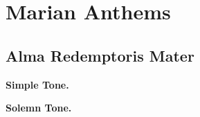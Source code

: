 \chapter{Marian Anthems}
{
\def\nogabcbreaks{T}
\newcommand{\printsimpletone}{
\vspace{-1ex plus 1ex minus 1ex}
\needspace{3\baselineskip}
\begin{center}\textbf{Simple Tone.}\end{center}
\vspace{-1ex plus 1ex minus 1ex}
}
\newcommand{\printsolemntone}{
\vspace{-1ex plus 1ex minus 1ex}
\oldneedspace{3\baselineskip}
\begin{center}\textbf{Solemn Tone.}\end{center}
\vspace{-1ex plus 1ex minus 1ex}
}
\newcommand{\afterant}{
\ifx\note\undefined\else%
\textit{\note}

\smallskip
\fi
\sloppy
\begin{columns}
\versicle{\vlatin}{\venglish}
\response{\rlatin}{\renglish}
\colchunk{}
\colplacechunks{}
\colchunk{\hspace*{3em}Orémus.}\colchunk{\hspace*{3em}Let us pray,}
\colplacechunks{}
\prayer{\prayerlatin}{\prayerenglish}
\end{columns}
\ifx\notetwo\undefined\else%
\medskip

\needspace{2\baselineskip}
\textit{\notetwo}

\smallskip
\begin{columns}
\versicle{\vlatintwo}{\venglishtwo}
\response{\rlatintwo}{\renglishtwo}
\colchunk{}
\colplacechunks{}
\colchunk{\hspace*{3em}Orémus.}\colchunk{\hspace*{3em}Let us pray,}
\colplacechunks{}
\prayer{\prayerlatintwo}{\prayerenglishtwo}
\end{columns}
\fi
}

\def\gabcfolder{../MarianAntiphons}
\newcommand{\includelilypond}[1]{
  \noindent
  {#1}%
}
\def\betweenLilyPondSystem#1{
  \ifnum#1>1
    \vfil\noindent
  \else
    \linebreak
  \fi
}

\section{Alma Redemptoris Mater}
\printsimpletone{}
\printsolemntone{}

}

